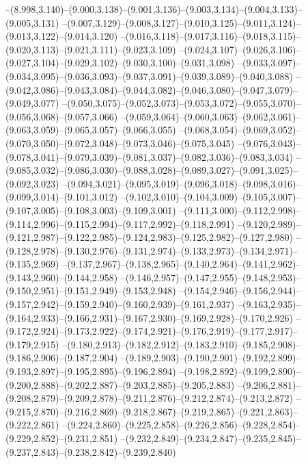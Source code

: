   --(8.998,3.140)--(9.000,3.138)--(9.001,3.136)--(9.003,3.134)--(9.004,3.133)--(9.005,3.131)%
  --(9.007,3.129)--(9.008,3.127)--(9.010,3.125)--(9.011,3.124)--(9.013,3.122)--(9.014,3.120)%
  --(9.016,3.118)--(9.017,3.116)--(9.018,3.115)--(9.020,3.113)--(9.021,3.111)--(9.023,3.109)%
  --(9.024,3.107)--(9.026,3.106)--(9.027,3.104)--(9.029,3.102)--(9.030,3.100)--(9.031,3.098)%
  --(9.033,3.097)--(9.034,3.095)--(9.036,3.093)--(9.037,3.091)--(9.039,3.089)--(9.040,3.088)%
  --(9.042,3.086)--(9.043,3.084)--(9.044,3.082)--(9.046,3.080)--(9.047,3.079)--(9.049,3.077)%
  --(9.050,3.075)--(9.052,3.073)--(9.053,3.072)--(9.055,3.070)--(9.056,3.068)--(9.057,3.066)%
  --(9.059,3.064)--(9.060,3.063)--(9.062,3.061)--(9.063,3.059)--(9.065,3.057)--(9.066,3.055)%
  --(9.068,3.054)--(9.069,3.052)--(9.070,3.050)--(9.072,3.048)--(9.073,3.046)--(9.075,3.045)%
  --(9.076,3.043)--(9.078,3.041)--(9.079,3.039)--(9.081,3.037)--(9.082,3.036)--(9.083,3.034)%
  --(9.085,3.032)--(9.086,3.030)--(9.088,3.028)--(9.089,3.027)--(9.091,3.025)--(9.092,3.023)%
  --(9.094,3.021)--(9.095,3.019)--(9.096,3.018)--(9.098,3.016)--(9.099,3.014)--(9.101,3.012)%
  --(9.102,3.010)--(9.104,3.009)--(9.105,3.007)--(9.107,3.005)--(9.108,3.003)--(9.109,3.001)%
  --(9.111,3.000)--(9.112,2.998)--(9.114,2.996)--(9.115,2.994)--(9.117,2.992)--(9.118,2.991)%
  --(9.120,2.989)--(9.121,2.987)--(9.122,2.985)--(9.124,2.983)--(9.125,2.982)--(9.127,2.980)%
  --(9.128,2.978)--(9.130,2.976)--(9.131,2.974)--(9.133,2.973)--(9.134,2.971)--(9.135,2.969)%
  --(9.137,2.967)--(9.138,2.965)--(9.140,2.964)--(9.141,2.962)--(9.143,2.960)--(9.144,2.958)%
  --(9.146,2.957)--(9.147,2.955)--(9.148,2.953)--(9.150,2.951)--(9.151,2.949)--(9.153,2.948)%
  --(9.154,2.946)--(9.156,2.944)--(9.157,2.942)--(9.159,2.940)--(9.160,2.939)--(9.161,2.937)%
  --(9.163,2.935)--(9.164,2.933)--(9.166,2.931)--(9.167,2.930)--(9.169,2.928)--(9.170,2.926)%
  --(9.172,2.924)--(9.173,2.922)--(9.174,2.921)--(9.176,2.919)--(9.177,2.917)--(9.179,2.915)%
  --(9.180,2.913)--(9.182,2.912)--(9.183,2.910)--(9.185,2.908)--(9.186,2.906)--(9.187,2.904)%
  --(9.189,2.903)--(9.190,2.901)--(9.192,2.899)--(9.193,2.897)--(9.195,2.895)--(9.196,2.894)%
  --(9.198,2.892)--(9.199,2.890)--(9.200,2.888)--(9.202,2.887)--(9.203,2.885)--(9.205,2.883)%
  --(9.206,2.881)--(9.208,2.879)--(9.209,2.878)--(9.211,2.876)--(9.212,2.874)--(9.213,2.872)%
  --(9.215,2.870)--(9.216,2.869)--(9.218,2.867)--(9.219,2.865)--(9.221,2.863)--(9.222,2.861)%
  --(9.224,2.860)--(9.225,2.858)--(9.226,2.856)--(9.228,2.854)--(9.229,2.852)--(9.231,2.851)%
  --(9.232,2.849)--(9.234,2.847)--(9.235,2.845)--(9.237,2.843)--(9.238,2.842)--(9.239,2.840)%
